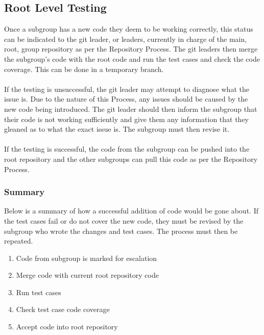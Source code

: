 \documentclass{article}
\begin{document}
\subsection{Root Level Testing}
\label{root}
Once a subgroup has a new code they deem to be working correctly, this status can be indicated to the git leader, or leaders, currently in charge of the main, root, group repository as per the Repository Process. The git leaders then merge the subgroup's code with the root code and run the test cases and check the code coverage. This can be done in a temporary branch.\\
\\
If the testing is unsuccessful, the git leader may attempt to diagnose what the issue is. Due to the nature of this Process, any issues should be caused by the new code being introduced. The git leader should then inform the subgroup that their code is not working sufficiently and give them any information that they gleaned as to what the exact issue is. The subgroup must then revise it.\\
\\
If the testing is successful, the code from the subgroup can be pushed into the root repository and the other subgroups can pull this code as per the Repository Process.\\

\subsubsection{Summary}
Below is a summary of how a successful addition of code would be gone about. If the test cases fail or do not cover the new code, they must be revised by the subgroup who wrote the changes and test cases. The process must then be repeated.
\begin{enumerate}
	\item Code from subgroup is marked for escalation
	\item Merge code with current root repository code
	\item Run test cases
	\item Check test case code coverage
	\item Accept code into root repository
\end{enumerate}

\end{document}
